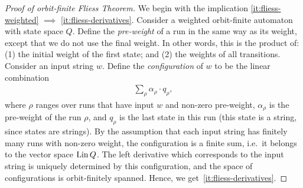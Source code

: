 \begin{theorem}
\begin{proof}[Proof of orbit-finite Fliess Theorem]
    We begin with the implication \ref{it:fliess-weighted} $\implies$ \ref{it:fliess-derivatives}. Consider a weighted orbit-finite automaton with state space $Q$. 
    Define the \emph{pre-weight} of a run in the same way as its weight, except that we do not use the final weight. In other words, this is the product of: (1) the initial weight of the first state; and (2) the weights of all transitions. Consider an input string $w$. Define the \emph{configuration} of $w$ to be the linear combination
    \begin{align}
        \label{eq:configuration-wa}
        \sum_\rho \alpha_\rho \cdot q_\rho,
    \end{align}
    where $\rho$ ranges over runs that have input $w$ and non-zero pre-weight, $\alpha_\rho$ is the pre-weight of the run $\rho$, and $q_\rho$ is the last state in this run (this state is a string, since states are strings). By the assumption that each input string has finitely many runs with non-zero weight, the configuration is a finite sum, i.e.~it belongs to the vector space $\operatorname{Lin} Q$. The left derivative which corresponds to the input string is uniquely determined by this configuration, and the space of configurations is orbit-finitely spanned. Hence, we get~\ref{it:fliess-derivatives}.


\end{proof}
\end{theorem}
